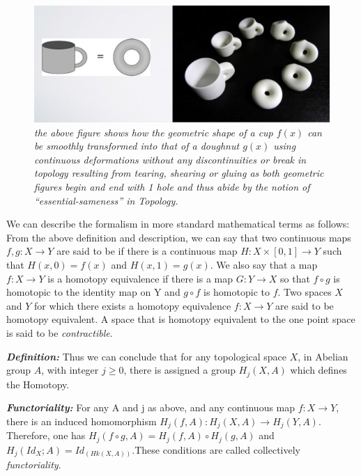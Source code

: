 \begin{figure}
	\centering
	\includegraphics[width=\linewidth]{images/02_Homotopy cup doughnut.jpg}
	\caption{\textit{the above figure shows how the geometric shape of a cup $f(x)$ can be smoothly transformed into that of a doughnut $g(x)$ using continuous deformations without any discontinuities or break in topology resulting from tearing, shearing or gluing as both geometric figures begin and end with 1 hole and thus abide by the notion of “essential-sameness” in Topology. }}
	\label{fig:Homotopy}
\end{figure}

We can describe the formalism in more standard mathematical terms as follows: From the above definition and description, we can say that two continuous maps $f, g : X \rightarrow Y$ are said to be  if there is a continuous map  $H :X \times [0, 1] \rightarrow Y$ such that $H(x, 0) = f(x)$ and $H(x, 1) = g(x)$. We also say that a map $f : X \rightarrow Y$ is a homotopy equivalence if there is a map $G : Y \rightarrow X$ so that $f \circ g$ is homotopic to the identity map on Y and $g \circ f$ is homotopic to $f$. Two spaces $X$ and $Y$ for which there exists a homotopy equivalence $f : X \rightarrow Y$ are said to be homotopy equivalent. A space that is homotopy equivalent to the one point space is said to be \textit{contractible}. \cite{07.1_Homotopy} \cite{07_bjorner2003Homotopy}

\textbf{\textit{Definition:}} Thus we can conclude that for any topological space $X$, in Abelian group $A$, with integer $j \ge 0$, there is assigned a group $H_j(X,A)$ which defines the Homotopy.

\textbf{\textit{Functoriality:}} For any A and j as above, and any continuous map $f : X \rightarrow Y$, there is an induced homomorphism $H_j(f,A) : H_j(X,A) \rightarrow H_j(Y,A)$. Therefore, one has $H_j(f \circ g,A) = H_j(f,A) \circ H_j(g,A)$ and $H_j(Id_X;A) = Id_(Hk(X,A))$.These conditions are called collectively \textit{functoriality}.\cite{05_mac2013Functoriality}

